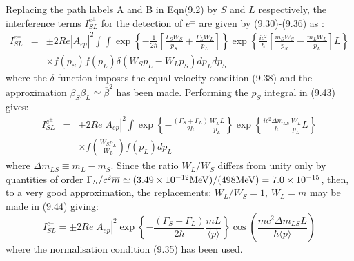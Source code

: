 \documentclass [12pt]{article}
\begin{document}
{    Replacing the path labels A and B in Eqn(9.2) by $S$ and $L$ respectively, the interference terms
    $I_{SL}^{e^{\pm}}$ for the detection of $e^{\pm}$ are given by (9.30)-(9.36) as :
      \begin{eqnarray}
  I_{SL}^{e^{\pm}} & = & \pm 2 Re \left| A_{ep} \right|^2 
   \int \int \exp\left\{-\frac{1}{2 \hbar}\left[\frac{\Gamma_S W_S}{p_S}+\frac{\Gamma_L W_L}{p_L}\right]\right\}
     \exp\left\{\frac{ic^2}{\hbar}\left[\frac{m_S W_S}{p_S}-\frac{m_L W_L}{p_L}\right] L \right\}   \nonumber \\     
     &  & \times  f(p_S)  f(p_L) \delta(W_S p_L-  W_L p_S) dp_L dp_S
     \end{eqnarray}
     where the $\delta$-function imposes the equal velocity condition (9.38) and the approximation 
     $\beta_S \beta_L \simeq  \overline{\beta}^2$ has been made. Performing the $p_S$ integral in
     (9.43) gives:
      \begin{eqnarray}
  I_{SL}^{e^{\pm}} & = & \pm 2 Re \left| A_{ep} \right|^2 
   \int \exp\left\{-\frac{(\Gamma_S+\Gamma_L)}{2 \hbar}\frac{ W_L L}{p_L}\right\}
     \exp\left\{\frac{ic^2 \Delta m_{LS}}{\hbar}\frac{W_L}{p_L}L \right\}   \nonumber \\     
     &  & \times  f(\frac{W_S p_L}{W_L})  f(p_L) dp_L
     \end{eqnarray}
     where $ \Delta m_{LS} \equiv m_L-m_S$. Since the ratio $W_L/W_S$ differs from unity only by
     quantities of order $\Gamma_S/c^2 \overline{m} \simeq (3.49 \times 10^{-12} {\rm MeV})/( 498{\rm MeV})
      = 7.0 \times 10^{-15}$, then, to a very good approximation, the replacements: $W_L/W_S =1$, $W_L = \overline{m}$
     may be made in (9.44) giving:
    \begin{equation}
    I_{SL}^{e^{\pm}} = \pm 2 Re \left| A_{ep} \right|^2 
      \exp\left\{-\frac{(\Gamma_S+\Gamma_L)}{2 \hbar}\frac{ \overline{m} L}{\langle p \rangle}\right\}
    \cos\left(\frac{ \overline{m} c^2 \Delta m_{LS} L}{ \hbar \langle p \rangle}\right)
     \end{equation}
    where the normalisation condition (9.35) has been used. 

}
\end{document}
